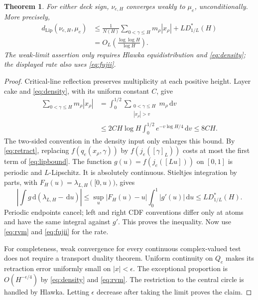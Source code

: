 \documentclass[11pt,a4paper]{article}
\newtheorem{theorem}{Theorem}[section]
\theoremstyle{definition}
\theoremstyle{remark}
\newcommand{\dd}{\,\mathrm d}
\newcommand{\Lip}{\operatorname{Lip}}
\begin{document}
\begin{theorem}\label{thm:limit}
For either deck sign, $\nu_{e,H}$ converges weakly to $\mu_e$,
unconditionally. More precisely,
\begin{align}
 d_{\Lip}(\nu_{e,H},\mu_e)
 &\le \frac1{N(H)}\sum_{0<\gamma\le H}m_\rho|x_\rho|
                 +L D_{1/L}^*(H) \label{eq:lipbound}\\
 &=O_L\!\left(\frac{\log\log H}{\log H}\right).\nonumber
\end{align}
The weak-limit assertion only requires Hlawka equidistribution and
\eqref{eq:density}; the displayed rate also uses \eqref{eq:fujii}.
\end{theorem}
\begin{proof}
Critical-line reflection preserves multiplicity at each positive height.
Layer cake and \eqref{eq:density}, with its uniform constant $C$, give
\begin{align*}
 \sum_{0<\gamma\le H}m_\rho|x_\rho|
 &=\int_0^{1/2}\sum_{\substack{0<\gamma\le H\\|x_\rho|>v}}
                     m_\rho\dd v\\
 &\le2CH\log H\int_0^{1/2}e^{-v\log H/4}\dd v
 \le8CH.
\end{align*}
The two-sided convention in the density input only enlarges this bound.
By \eqref{eq:retract}, replacing $f(q_e(x_\rho,\gamma))$ by
$f(j_e([\gamma]_L))$ costs at most the first term of \eqref{eq:lipbound}.
The function $g(u)=f(j_e([Lu]))$ on $[0,1]$ is periodic and $L$-Lipschitz.
It is absolutely continuous. Stieltjes integration by parts, with
$F_H(u)=\lambda_{L,H}([0,u))$, gives
\[
 \left|\int g\dd(\lambda_{L,H}-\dd u)\right|
 \le \sup_u|F_H(u)-u|\int_0^1|g'(u)|\dd u
 \le L D_{1/L}^*(H).
\]
Periodic endpoints cancel; left and right CDF conventions differ only at
atoms and have the same integral against $g'$. This proves the inequality.
Now use \eqref{eq:rvm} and \eqref{eq:fujii} for the rate.

For completeness, weak convergence for every continuous complex-valued test
does not require a transport duality theorem. Uniform continuity on $Q_e$
makes its retraction error uniformly small on $|x|<\epsilon$. The exceptional
proportion is $O(H^{-\epsilon/4})$ by \eqref{eq:density} and \eqref{eq:rvm}.
The restriction to the central circle is handled by Hlawka. Letting
$\epsilon$ decrease after taking the limit proves the claim.
\end{proof}
\end{document}
